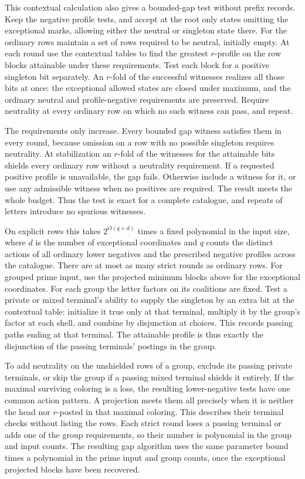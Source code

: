 This contextual calculation also gives a bounded-gap
test without prefix records. Keep the negative
profile tests, and accept at the root only states
omitting the exceptional marks, allowing either the
neutral or singleton state there. For the ordinary
rows maintain a set of rows required to be neutral,
initially empty. At each round use the contextual
tables to find the greatest $r$-profile on the row
blocks attainable under these requirements. Test
each block for a positive singleton bit separately.
An $r$-fold of the successful witnesses realizes
all those bits at once: the exceptional allowed
states are closed under maximum, and the ordinary
neutral and profile-negative requirements are
preserved. Require neutrality at every ordinary
row on which no such witness can pass, and repeat.

The requirements only increase. Every bounded gap
witness satisfies them in every round, because
omission on a row with no possible singleton
requires neutrality. At stabilization an $r$-fold
of the witnesses for the attainable bits shields
every ordinary row without a neutrality
requirement. If a requested positive profile is
unavailable, the gap fails. Otherwise include a
witness for it, or use any admissible witness when
no positives are required.
The result meets the whole budget. Thus the test
is exact for a complete catalogue, and repeats of
letters introduce no spurious witnesses.

On explicit rows this takes $2^{O(q+d)}$ times
a fixed polynomial in the input size, where $d$
is the number of exceptional coordinates and $q$
counts the distinct actions of all ordinary lower
negatives and the prescribed negative profiles
across the catalogue. There are at most as many
strict rounds as ordinary rows. For grouped prime
input, use the projected minimum blocks above
for the exceptional coordinates. For each group
the letter factors on its coalitions are fixed.
Test a private or mixed terminal's ability to supply
the singleton by an extra bit at the contextual
table: initialize it true only at that terminal,
multiply it by the group's factor at each shell,
and combine by disjunction at choices. This records
passing paths ending at that terminal. The attainable
profile is thus exactly the disjunction of the
passing terminals' postings in the group.

To add neutrality on the unshielded rows of a
group, exclude its passing private terminals, or
skip the group if a passing mixed terminal shields
it entirely. If the maximal surviving coloring
is a loss, the resulting lower-negative tests
have one common action pattern. A projection
meets them all precisely when it is neither the
head nor $r$-posted in that maximal coloring.
This describes their terminal checks without
listing the rows. Each strict round loses a passing
terminal or adds one of the group requirements,
so their number is polynomial in the group and
input counts. The resulting gap algorithm uses the
same parameter bound times a polynomial in the
prime input and group counts, once the exceptional
projected blocks have been recovered.

